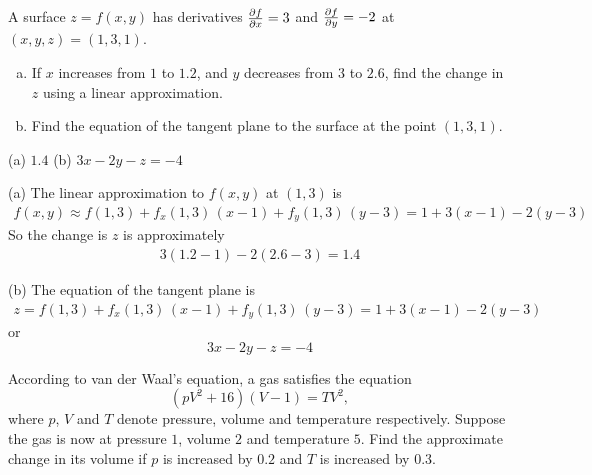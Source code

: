 \begin{question}[M200 2010A] %
A surface $z = f (x, y)$ has derivatives $\pdiff{f}{x}=3$ and
$\pdiff{f}{y}=-2$ at $(x, y, z) = (1, 3, 1)$.
\begin{enumerate}[(a)]
\item
If $x$ increases from $1$ to $1.2$, and $y$ decreases from $3$ to $2.6$,
find the change in $z$ using a linear approximation.
\item
Find the equation of the tangent plane to the surface at the point $(1, 3, 1)$.
\end{enumerate}

\end{question}

%

\begin{answer}
(a) $1.4$\qquad
(b) $3x-2y-z = -4$
\end{answer}

\begin{solution}
(a) The linear approximation to $f(x,y)$ at $(1,3)$ is
\begin{align*}
f(x,y) \approx f(1,3) + f_x(1,3)\,(x-1) +f_y(1,3)\,(y-3)
      = 1 + 3(x-1) -2(y-3)
\end{align*}
So the change is $z$ is approximately
\begin{align*}
3(1.2-1) -2(2.6-3)
= 1.4
\end{align*}

(b) The equation of the tangent plane is
\begin{align*}
z = f(1,3) + f_x(1,3)\,(x-1) +f_y(1,3)\,(y-3) = 1 + 3(x-1) -2(y-3)
\end{align*}
or
\begin{equation*}
3x-2y-z = -4
\end{equation*}

\end{solution}

\begin{question}[M200 2011A] %
According to van der Waal's equation, a gas satisfies the equation
\begin{equation*}
(pV^2 + 16)(V - 1) = T V^2 ,
\end{equation*}
where $p$, $V$ and $T$ denote pressure, volume and temperature respectively. 
Suppose the gas is now at pressure $1$, volume $2$ and temperature $5$. Find the 
approximate change in its volume if $p$ is increased by $0.2$ and $T$ is increased by $0.3$.
\end{question}

